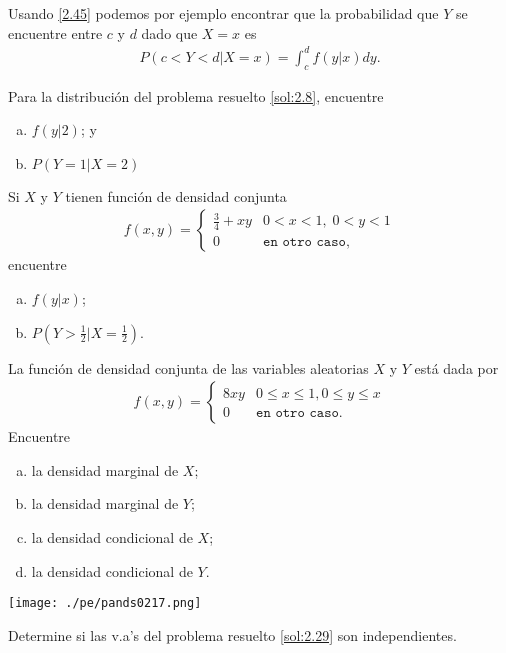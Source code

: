  Usando \eqref{2.45} podemos por ejemplo encontrar que la probabilidad que $Y$  se encuentre entre $c$ y $d$ dado que $X=x$ es
 \begin{align}
  \label{2.46}P(c<Y<d|X=x)=
  \int_{c}^{d}f(y|x)dy.
 \end{align}




 \begin{exmp}
  \label{sol:2.27}
  Para la distribución del problema resuelto \ref{sol:2.8}, encuentre
  \begin{enumerate}[(a)]
   \item $f(y|2)$; y  
   \item $P(Y=1|X=2)$
  \end{enumerate}

 \end{exmp}



\begin{exmp}
 \label{sol:2.28}
  Si $X$ y $Y$ tienen función de densidad conjunta
 \begin{align}
  f(x,y)=
  \begin{cases}
   \frac{3}{4}+xy & 0<x<1, \; 0<y<1 \\
   0 & \texttt{en otro caso},
  \end{cases}
 \end{align}
encuentre
\begin{enumerate}[(a)]
 \item $f(y|x)$; 
 \item $P(Y>\frac{1}{2}| X = \frac{1}{2} )$.
\end{enumerate}

\end{exmp}



 \begin{exmp}
  \label{sol:2.29}
  La función de densidad conjunta de las variables aleatorias $X$ y $Y$ está dada por
  \begin{align}
   f(x,y)=
   \begin{cases}
    8xy & 0\leq x \leq 1, 0\leq y \leq x \\
    0 & \texttt{en otro caso}.
   \end{cases}
  \end{align}
Encuentre
\begin{enumerate}[(a)]
 \item la densidad marginal de $X$; 
 \item la densidad marginal de $Y$; 
 \item la densidad condicional de $X$; 
 \item la densidad condicional de $Y$.
\end{enumerate}

 \end{exmp}



 \begin{center}
 \texttt{[image: ./pe/pands0217.png]}
\end{center}



 \begin{exmp}
  \label{sol:2.30}
  Determine si las v.a's del problema resuelto \ref{sol:2.29} son independientes.
 \end{exmp}



